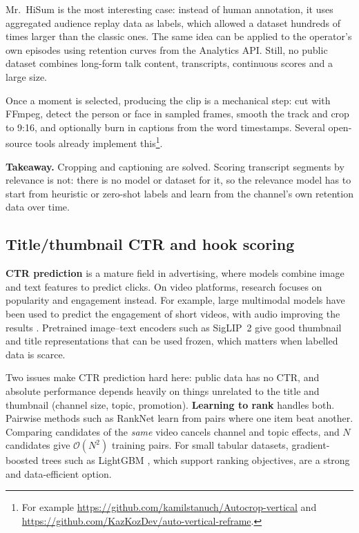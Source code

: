 \documentclass[ENG]{TFUOC}
\begin{document}
Mr.~HiSum is the most interesting case: instead of human annotation, it uses aggregated audience replay data as labels, which allowed a dataset hundreds of times larger than the classic ones. The same idea can be applied to the operator's own episodes using retention curves from the Analytics API. Still, no public dataset combines long-form talk content, transcripts, continuous scores and a large size.

Once a moment is selected, producing the clip is a mechanical step: cut with FFmpeg, detect the person or face in sampled frames, smooth the track and crop to 9:16, and optionally burn in captions from the word timestamps. Several open-source tools already implement this\footnote{For example \url{https://github.com/kamilstanuch/Autocrop-vertical} and \url{https://github.com/KazKozDev/auto-vertical-reframe}.}.

\textbf{Takeaway.} Cropping and captioning are solved. Scoring transcript segments by relevance is not: there is no model or dataset for it, so the relevance model has to start from heuristic or zero-shot labels and learn from the channel's own retention data over time.

\subsection{Title/thumbnail CTR and hook scoring}
\label{ss:soa-ctr}

\textbf{CTR prediction} is a mature field in advertising, where models combine image and text features to predict clicks. On video platforms, research focuses on popularity and engagement instead. For example, large multimodal models have been used to predict the engagement of short videos, with audio improving the results \cite{sun2025engagement}. Pretrained image--text encoders such as SigLIP~2 \cite{tschannen2025siglip2} give good thumbnail and title representations that can be used frozen, which matters when labelled data is scarce.

Two issues make CTR prediction hard here: public data has no CTR, and absolute performance depends heavily on things unrelated to the title and thumbnail (channel size, topic, promotion). \textbf{Learning to rank} handles both. Pairwise methods such as RankNet \cite{burges2005ranknet} learn from pairs where one item beat another. Comparing candidates of the \emph{same} video cancels channel and topic effects, and $N$ candidates give $\mathcal{O}(N^2)$ training pairs. For small tabular datasets, gradient-boosted trees such as LightGBM \cite{ke2017lightgbm}, which support ranking objectives, are a strong and data-efficient option.
\end{document}
